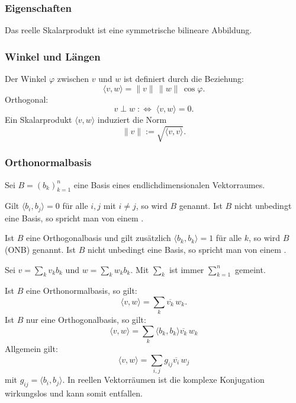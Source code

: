 \subsubsection{Eigenschaften}
Das reelle Skalarprodukt ist eine symmetrische bilineare Abbildung.

\subsubsection{Winkel und Längen}
 Der Winkel $\varphi$ zwischen $v$ und $w$
ist definiert durch die Beziehung:
\begin{equation}
\langle v,w\rangle = \|v\|\,\|w\|\,\cos\varphi.
\end{equation}
 Orthogonal:
\begin{equation}
v\perp w \;:\Longleftrightarrow\; \langle v,w\rangle=0.
\end{equation}
Ein Skalarprodukt $\langle v,w\rangle$ induziert die Norm
\begin{equation}
\|v\| := \sqrt{\langle v,v\rangle}.
\end{equation}

\subsubsection{Orthonormalbasis}
Sei $B=(b_k)_{k=1}^n$ eine Basis eines endlichdimensionalen
Vektorraumes.

 Gilt $\langle b_i,b_j\rangle=0$
für alle $i,j$ mit $i\ne j$, so wird $B$ 
genannt. Ist $B$ nicht unbedingt eine Basis, so spricht man von einem 
.

 Ist $B$ eine Orthogonalbasis und gilt
zusätzlich $\langle b_k,b_k\rangle=1$ für alle $k$, so wird
$B$  (ONB) genannt. Ist $B$ nicht unbedingt
eine Basis,  so spricht man von einem .

Sei $v=\sum_k v_kb_k$ und $w=\sum_k w_kb_k$.
Mit $\sum_k$ ist immer $\sum_{k=1}^n$ gemeint.

Ist $B$ eine Orthonormalbasis, so gilt:
\begin{equation}
\langle v,w\rangle = \sum_k \overline{v_k}\,w_k.
\end{equation}
Ist $B$ nur eine Orthogonalbasis, so gilt:
\begin{equation}
\langle v,w\rangle = \sum_k \langle b_k,b_k\rangle \overline{v_k}\,w_k
\end{equation}
Allgemein gilt:
\begin{equation}
\langle v,w\rangle = \sum_{i,j} g_{ij} \overline{v_i}\,w_j
\end{equation}
mit $g_{ij}=\langle b_i,b_j\rangle$. In reellen Vektorräumen
ist die komplexe Konjugation wirkungslos und kann somit entfallen.

